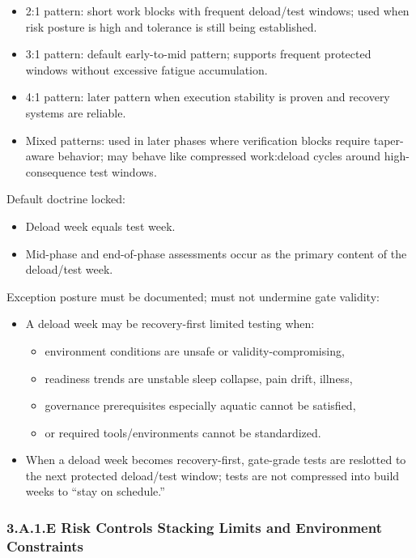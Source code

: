 \documentclass[10pt]{article}
\begin{document}
\begin{itemize}
\item 2:1 pattern: short work blocks with frequent deload/test windows; used when risk posture is high and tolerance is still being established.
\item 3:1 pattern: default early-to-mid pattern; supports frequent protected windows without excessive fatigue accumulation.
\item 4:1 pattern: later pattern when execution stability is proven and recovery systems are reliable.
\item Mixed patterns: used in later phases where verification blocks require taper-aware behavior; may behave like compressed work:deload cycles around high-consequence test windows.
\end{itemize}

Default doctrine locked:

\begin{itemize}
\item Deload week equals test week.
\item Mid-phase and end-of-phase assessments occur as the primary content of the deload/test week.
\end{itemize}

Exception posture must be documented; must not undermine gate validity:

\begin{itemize}
\item A deload week may be recovery-first limited testing when:
  \begin{itemize}
  \item environment conditions are unsafe or validity-compromising,
  \item readiness trends are unstable sleep collapse, pain drift, illness,
  \item governance prerequisites especially aquatic cannot be satisfied,
  \item or required tools/environments cannot be standardized.
  \end{itemize}
\item When a deload week becomes recovery-first, gate-grade tests are reslotted to the next protected deload/test window; tests are not compressed into build weeks to “stay on schedule.”
\end{itemize}

\subsubsection*{3.A.1.E Risk Controls Stacking Limits and Environment Constraints}
\end{document}
